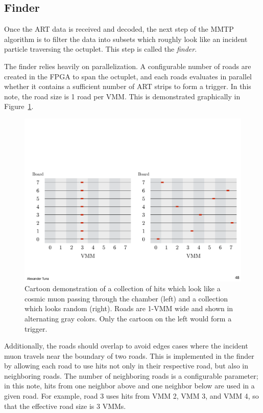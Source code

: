 \subsection{Finder}
\label{sec:alg-finder}

Once the ART data is received and decoded, the next step of the MMTP algorithm is to filter the data into subsets which roughly look like an incident particle traversing the octuplet. This step is called the \textit{finder}.

The finder relies heavily on parallelization. A configurable number of roads are created in the FPGA to span the octuplet, and each roads evaluates in parallel whether it contains a sufficient number of ART strips to form a trigger. In this note, the road size is 1 road per VMM. This is demonstrated graphically in Figure~\ref{fig:cartoon_road_demo}.

\begin{figure}[!htpb]
  \begin{center}
    \includegraphics[width=1.0\textwidth]{figures/cartoons/cartoon_road_demo}
  \end{center}
  \vspace{-20pt}
  \caption{Cartoon demonstration of a collection of hits which look like a cosmic muon passing through the chamber (left) and a collection which looks random (right). Roads are 1-VMM wide and shown in alternating gray colors. Only the cartoon on the left would form a trigger.}
  \label{fig:cartoon_road_demo}
\end{figure}

Additionally, the roads should overlap to avoid edges cases where the incident muon travels near the boundary of two roads. This is implemented in the finder by allowing each road to use hits not only in their respective road, but also in neighboring roads. The number of neighboring roads is a configurable parameter; in this note, hits from one neighbor above and one neighbor below are used in a given road. For example, road 3 uses hits from VMM 2, VMM 3, and VMM 4, so that the effective road size is 3 VMMs.

